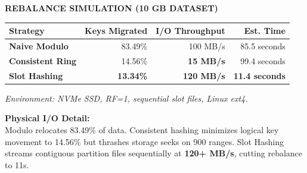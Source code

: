 \documentclass[12pt]{article}
\begin{document}
\begin{minipage}[t]{0.48\textwidth}
    \vspace{0pt}
    {\fontsize{9.5}{11}\selectfont\color{shidenmuted}\textbf{REBALANCE SIMULATION (10 GB DATASET)}\par}
    \vspace{3.5mm}
    
    \fontsize{9.5}{12.5}\selectfont
    \noindent
    \begin{tabular}{lrrr}
    \toprule
    \textbf{Strategy} & \textbf{Keys Migrated} & \textbf{I/O Throughput} & \textbf{Est. Time} \\
    \midrule
    \textbf{Naive Modulo} & 83.49\% & 100 MB/s & 85.5 seconds \\
    \textbf{Consistent Ring} & 14.56\% & \color{shidenerror}\textbf{15 MB/s} & 99.4 seconds \\
    \textbf{Slot Hashing} & \textbf{13.34\%} & \color{shidensuccess}\textbf{120 MB/s} & \textbf{11.4 seconds} \\
    \bottomrule
    \end{tabular}
    
    \vspace{2.5mm}
    {\fontsize{7.5}{9}\selectfont\color{shidenmuted}\textit{Environment: NVMe SSD, RF=1, sequential slot files, Linux ext4.}\par}
    
    \vspace{3mm}
    \fontsize{9.5}{12.5}\selectfont
    \noindent\textcolor{shidenaccent}{\textbf{Physical I/O Detail:}}\\
    Modulo relocates 83.49\% of data. Consistent hashing minimizes logical key movement to 14.56\% but thrashes storage seeks on 900 ranges. Slot Hashing streams contiguous partition files sequentially at \textbf{120+ MB/s}, cutting rebalance to 11s.
\end{minipage}
\clearpage
\end{document}
